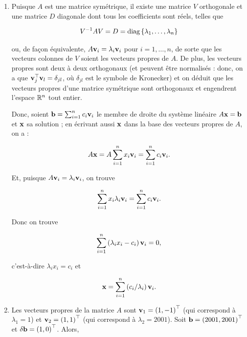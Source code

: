\begin{enumerate}[label=\alph*)]
  \item Puisque $A$ est une matrice symétrique, il existe une matrice $V$ orthogonale et une matrice $D$ diagonale dont tous les coefficients sont réels, telles que
  
  \begin{equation*}
    V^{-1} A V = D = \text{diag} \left\{\lambda_{1}, \dots, \lambda_{n}\right\}
  \end{equation*}
  
  ou, de façon équivalente, $A \mathbf{v}_{i} = \lambda_{i} \mathbf{v}_{i}$ pour $i = 1, \dots, n$, de sorte que les vecteurs colonnes de $V$ soient les vecteurs propres de $A$.
  De plus, les vecteurs propres sont deux à deux orthogonaux (et peuvent être normalisés : donc, on a que $\mathbf{v}_{j}^{\top} \mathbf{v}_{l} = \delta_{jl}$, où $\delta_{jl}$ est le symbole de Kronecker) et on déduit que les vecteurs propres d'une matrice symétrique sont orthogonaux et engendrent l'espace $\mathbb{R}^{n}$ tout entier.


  Donc, soient $\mathbf{b} = \sum_{i = 1}^{n} c_{i} \mathbf{v}_{i}$ le membre de droite du système linéaire $A \mathbf{x} = \mathbf{b}$ et $\mathbf{x}$ sa solution ; en écrivant aussi $\mathbf{x}$ dans la base des vecteurs propres de $A$, on a :
  
  \begin{equation*}
    A \mathbf{x}
    = A \sum_{i = 1}^{n} x_{i} \mathbf{v}_{i} 
    = \sum_{i = 1}^{n} c_{i} \mathbf{v}_{i}.
  \end{equation*}
  
  Et, puisque $A \mathbf{v}_{i} = \lambda_{i} \mathbf{v}_{i}$, on trouve
  
  \begin{equation*}
    \sum_{i = 1}^{n} x_{i} \lambda_{i} \mathbf{v}_{i} 
    = \sum_{i = 1}^{n} c_{i} \mathbf{v}_{i}.
  \end{equation*}
  
  Donc on trouve
  
  \begin{equation*}
    \sum_{i = 1}^{n} \left(\lambda_{i} x_{i} - c_{i}\right) \mathbf{v}_{i} 
    = 0,
  \end{equation*}
  
  c'est-à-dire $\lambda_{i} x_{i} = c_{i}$ et
  
  \begin{equation*}
    \mathbf{x} = \sum_{i = 1}^{n} \left(c_{i} / \lambda_{i}\right) \mathbf{v}_{i}.
  \end{equation*}
  
  
  \item Les vecteurs propres de la matrice $A$ sont $\mathbf{v}_{1} = \left(1, -1\right)^{\top}$ (qui correspond à $\lambda_{1} = 1$) et $\mathbf{v}_{2} = \left(1, 1\right)^{\top}$ (qui correspond à $\lambda_{2} = 2001$).
  Soit $\mathbf{b} = \left(2001, 2001\right)^{\top}$ et $\delta \mathbf{b} = \left(1, 0\right)^{\top}$.
  Alors,
  

\end{enumerate}

